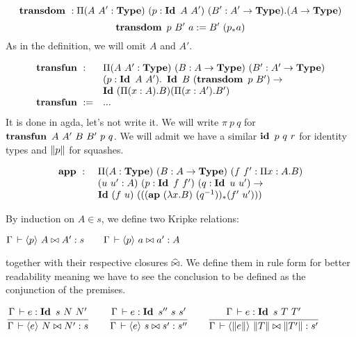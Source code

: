 \documentclass[a4paper,english]{lipics-utf8x}
\begin{document}
  \[
    \operatorname{\mathbf{transdom}~} : \Pi (A\ A' : \operatorname{\mathbf{Type}})\ (p : \operatorname{\mathbf{Id}~} A\ A')\ (B' : A' \to \operatorname{\mathbf{Type}}).
                (A \to \operatorname{\mathbf{Type}})
  \]
  \[
    \operatorname{\mathbf{transdom}~} p\ B'\ a := B'\ (p_* a)
  \]
  As in the definition, we will omit $A$ and $A'$.

  \[
  \begin{array}{l@{\quad}l}
    \transfun :~& \Pi (A\ A' : \Type)\ (B : A \to \Type)\ (B' : A' \to \Type) \\
                & (p : \Id A\ A').\ \Id B\ (\transdom p\ B') \to \\
                & \Id (\Pi (x:A).B) (\Pi (x:A').B') \\
    \transfun :=& ...
  \end{array}
  \]
  It is done in agda, let's not write it.
  We will write $\pi\ p\ q$ for $\operatorname{\mathbf{transfun}~} A\ A'\ B\ B'\ p\ q$.
  We will admit we have a similar $\id\ p\ q\ r$ for identity types and
  $\|p\|$ for squashes.

  \[
  \begin{array}{l@{\quad}l}
    \app :~& \Pi (A : \Type)\ (B : A \to \Type)\ (f\ f' : \Pi x:A.B) \\
           & (u\ u' : A)\ (p : \Id f\ f')\ (q : \Id u\ u') \to \\
           & \Id (f\ u)\ (((\ap (\lambda x.B)\ (q\inv))_* (f'\ u')))
  \end{array}
  \]


  By induction on $A \in s$, we define two Kripke relations:
  \begin{center}
  \(
    \Gamma \,\vdash \langle p \rangle~ A \mathrel{\bowtie} A' : s
    \qquad
    \Gamma \,\vdash \langle p \rangle~ a \mathrel{\bowtie} a' : A
  \)
  \end{center}
  together with their respective closures $\mathrel{\widehat{\bowtie}}$.
  We define them in rule form for better readability meaning we have to see the
  conclusion to be defined as the conjunction of the premises.

  \begin{mathc}
    \qquad
  \end{mathc}

  \begin{center}
  \(
    \ru{\Gamma \der e : \Id s\ N\ N'
      }{\Gamma \der \hideq{e} N \Er N' : s}
    \qquad
    \ru{\Gamma \der e : \Id s''\ s\ s'
      }{\Gamma \der \hideq{e} s \Er s' : s''}
    \qquad
    \ru{\Gamma \der e : \Id s\ T\ T'
      }{\Gamma \der \hideq{\squash{e}} \squash{T} \Er \squash{T'} : s'}
  \)
  \end{center}
\end{document}
